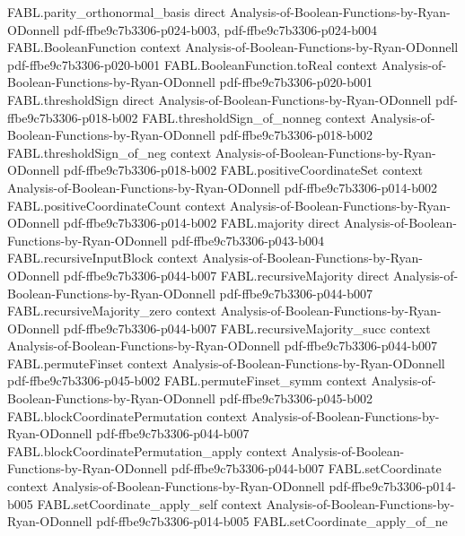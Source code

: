 \begin{theorem}
\proofstep
  {FABL.parity_orthonormal_basis}
  {direct}
  {Analysis-of-Boolean-Functions-by-Ryan-ODonnell}
  {pdf-ffbe9c7b3306-p024-b003,
    pdf-ffbe9c7b3306-p024-b004}
\proofstep
  {FABL.BooleanFunction}
  {context}
  {Analysis-of-Boolean-Functions-by-Ryan-ODonnell}
  {pdf-ffbe9c7b3306-p020-b001}
\proofstep
  {FABL.BooleanFunction.toReal}
  {context}
  {Analysis-of-Boolean-Functions-by-Ryan-ODonnell}
  {pdf-ffbe9c7b3306-p020-b001}
\proofstep
  {FABL.thresholdSign}
  {direct}
  {Analysis-of-Boolean-Functions-by-Ryan-ODonnell}
  {pdf-ffbe9c7b3306-p018-b002}
\proofstep
  {FABL.thresholdSign_of_nonneg}
  {context}
  {Analysis-of-Boolean-Functions-by-Ryan-ODonnell}
  {pdf-ffbe9c7b3306-p018-b002}
\proofstep
  {FABL.thresholdSign_of_neg}
  {context}
  {Analysis-of-Boolean-Functions-by-Ryan-ODonnell}
  {pdf-ffbe9c7b3306-p018-b002}
\proofstep
  {FABL.positiveCoordinateSet}
  {context}
  {Analysis-of-Boolean-Functions-by-Ryan-ODonnell}
  {pdf-ffbe9c7b3306-p014-b002}
\proofstep
  {FABL.positiveCoordinateCount}
  {context}
  {Analysis-of-Boolean-Functions-by-Ryan-ODonnell}
  {pdf-ffbe9c7b3306-p014-b002}
\proofstep
  {FABL.majority}
  {direct}
  {Analysis-of-Boolean-Functions-by-Ryan-ODonnell}
  {pdf-ffbe9c7b3306-p043-b004}
\proofstep
  {FABL.recursiveInputBlock}
  {context}
  {Analysis-of-Boolean-Functions-by-Ryan-ODonnell}
  {pdf-ffbe9c7b3306-p044-b007}
\proofstep
  {FABL.recursiveMajority}
  {direct}
  {Analysis-of-Boolean-Functions-by-Ryan-ODonnell}
  {pdf-ffbe9c7b3306-p044-b007}
\proofstep
  {FABL.recursiveMajority_zero}
  {context}
  {Analysis-of-Boolean-Functions-by-Ryan-ODonnell}
  {pdf-ffbe9c7b3306-p044-b007}
\proofstep
  {FABL.recursiveMajority_succ}
  {context}
  {Analysis-of-Boolean-Functions-by-Ryan-ODonnell}
  {pdf-ffbe9c7b3306-p044-b007}
\proofstep
  {FABL.permuteFinset}
  {context}
  {Analysis-of-Boolean-Functions-by-Ryan-ODonnell}
  {pdf-ffbe9c7b3306-p045-b002}
\proofstep
  {FABL.permuteFinset_symm}
  {context}
  {Analysis-of-Boolean-Functions-by-Ryan-ODonnell}
  {pdf-ffbe9c7b3306-p045-b002}
\proofstep
  {FABL.blockCoordinatePermutation}
  {context}
  {Analysis-of-Boolean-Functions-by-Ryan-ODonnell}
  {pdf-ffbe9c7b3306-p044-b007}
\proofstep
  {FABL.blockCoordinatePermutation_apply}
  {context}
  {Analysis-of-Boolean-Functions-by-Ryan-ODonnell}
  {pdf-ffbe9c7b3306-p044-b007}
\proofstep
  {FABL.setCoordinate}
  {context}
  {Analysis-of-Boolean-Functions-by-Ryan-ODonnell}
  {pdf-ffbe9c7b3306-p014-b005}
\proofstep
  {FABL.setCoordinate_apply_self}
  {context}
  {Analysis-of-Boolean-Functions-by-Ryan-ODonnell}
  {pdf-ffbe9c7b3306-p014-b005}
\proofstep
  {FABL.setCoordinate_apply_of_ne}

\end{theorem}
